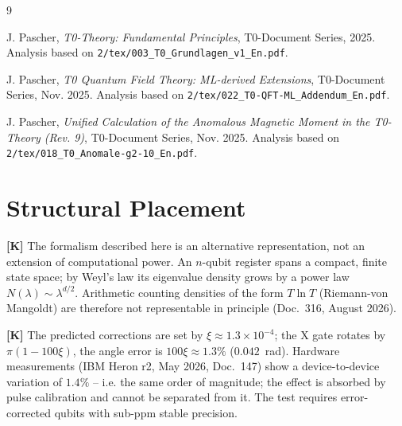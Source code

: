 	\begin{thebibliography}{9}
		
		J. Pascher, \textit{T0-Theory: Fundamental Principles}, T0-Document Series, 2025.
		Analysis based on \texttt{2/tex/003\_T0\_Grundlagen\_v1\_En.pdf}.
		
		J. Pascher, \textit{T0 Quantum Field Theory: ML-derived Extensions}, T0-Document Series, Nov. 2025.
		Analysis based on \texttt{2/tex/022\_T0-QFT-ML\_Addendum\_En.pdf}.
		
		J. Pascher, \textit{Unified Calculation of the Anomalous Magnetic Moment in the T0-Theory (Rev. 9)}, T0-Document Series, Nov. 2025.
		Analysis based on \texttt{2/tex/018\_T0\_Anomale-g2-10\_En.pdf}.
		
	\end{thebibliography}

\section{Structural Placement}

\textbf{[K]} The formalism described here is an alternative representation, not
an extension of computational power. An $n$-qubit register spans a compact,
finite state space; by Weyl's law its eigenvalue density grows by a power law
$N(\lambda) \sim \lambda^{d/2}$. Arithmetic counting densities of the form
$T \ln T$ (Riemann-von Mangoldt) are therefore not representable in principle
(Doc.~316, August 2026).

\textbf{[K]} The predicted corrections are set by $\xi \approx 1.3 \times 10^{-4}$;
the X gate rotates by $\pi(1-100\xi)$, the angle error is $100\xi \approx 1.3\%$ ($0.042$~rad).
Hardware measurements (IBM Heron r2, May 2026, Doc.~147) show a
device-to-device variation of $1.4\%$ -- i.e. the same order of magnitude; the
effect is absorbed by pulse calibration and cannot be separated from it.
The test requires error-corrected qubits with sub-ppm stable
precision.
